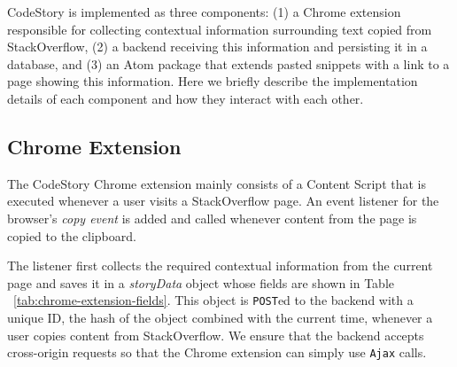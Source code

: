 \documentclass[../manifest.tex]{subfiles}
\begin{document}
CodeStory is implemented as three components: (1) a Chrome extension responsible for collecting contextual information surrounding text copied from StackOverflow, (2) a backend receiving this information and persisting it in a database, and (3) an Atom package that
extends pasted snippets with a link to a page showing this information. Here we briefly describe the implementation details of each component and how they interact with each other.

\subsection{Chrome Extension}
The CodeStory Chrome extension mainly consists of a Content Script that is executed whenever a user visits a StackOverflow page. An event listener for the browser's \textit{copy event} is added and called whenever content from the page is copied to the clipboard.

The listener first collects the required contextual information from the current page and saves it in a \textit{storyData} object whose fields are shown in Table ~\ref{tab:chrome-extension-fields}. This object is \texttt{POST}ed to the backend
with a unique ID, the hash of the object combined with the current time, whenever a user copies content from StackOverflow. We ensure that the backend accepts cross-origin requests so that the Chrome extension can simply use \texttt{Ajax} calls.
\end{document}
